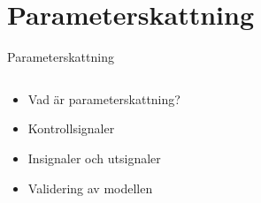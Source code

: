 \documentclass[11pt,aspectratio=169]{beamer}
\begin{document}
\section{Parameterskattning}
\begin{frame}{Parameterskattning}
\begin{columns}
\begin{column}{0.5\textwidth}
\begin{itemize}
\item {Vad är parameterskattning?}
\item {Kontrollsignaler}
\item {Insignaler och utsignaler}
\item {Validering av modellen}
\end{itemize}
\end{column}
\begin{column}{0.5\textwidth}





\end{column}
\end{columns}
\end{frame}
\end{document}
